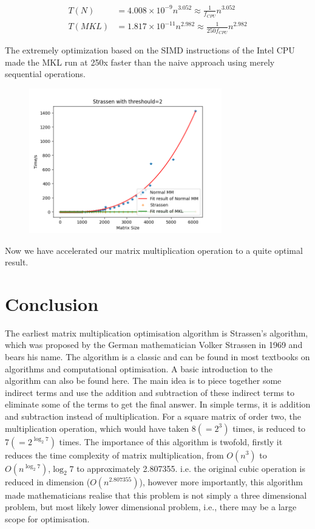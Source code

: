 \documentclass[UTF8]{ctexart}
\begin{document}
\begin{equation}
  \begin{aligned}
    T(N)   & =4.008\times 10^{-9}n^{3.052}\approx \frac{1}{f_{CPU}}n^{3.052}    \\
    T(MKL) & =1.817\times10^{-11}n^{2.982}\approx \frac{1}{250f_{CPU}}n^{2.982}
  \end{aligned}
\end{equation}

The extremely optimization based on the SIMD instructions of the Intel
CPU made the MKL run at 250x faster than the naive approach using merely
sequential operations.

\begin{figure}[htb]
  \centering
  \includegraphics[height=6.3cm]{../ppt/slide-UIBK/mkl.png}
  \caption{}
\end{figure}
Now we have accelerated our matrix multiplication operation to a quite
optimal result.

\section{Conclusion}
\label{sec::Conc}

The earliest matrix multiplication optimisation algorithm is Strassen's algorithm\cite{strassen1969gaussian}, which was proposed by the German mathematician Volker Strassen in 1969 and bears his name. The algorithm is a classic and can be found in most textbooks on algorithms and computational optimisation. A basic introduction to the algorithm can also be found here. The main idea is to piece together some indirect terms and use the addition and subtraction of these indirect terms to eliminate some of the terms to get the final answer. In simple terms, it is addition and subtraction instead of multiplication. For a square matrix of order two, the multiplication operation, which would have taken 8\((=2^{3})\) times, is reduced to 7\((=2^{\log_{2} 7})\) times. The importance of this algorithm is twofold, firstly it reduces the time complexity of matrix multiplication, from \(O(n^3)\) to \(O(n^{\log_{2} 7})\),\(\log_{2} 7\) to approximately 2.807355. i.e. the original cubic operation is reduced in dimension (\(O(n^{2.807355})\)), however more importantly, this algorithm made mathematicians realise that this problem is not simply a three dimensional problem, but most likely lower dimensional problem, i.e., there may be a large scope for optimisation.
\end{document}
